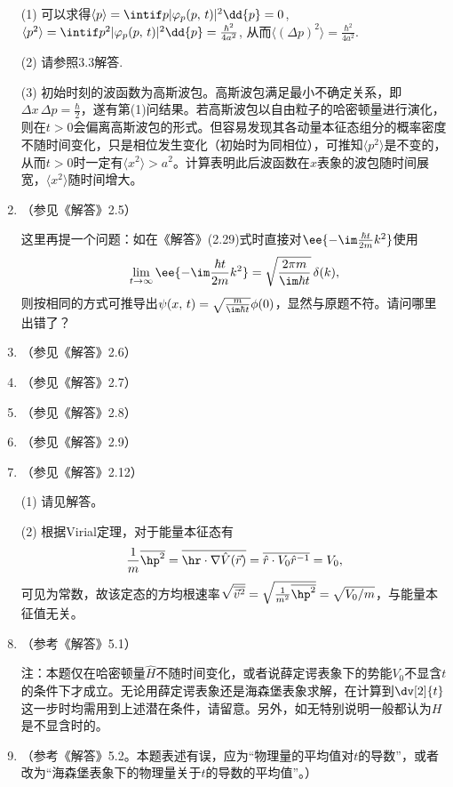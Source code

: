 \begin{enumerate}[label=\textbf{3.\arabic*}]
(1) 可以求得$\langle p\rangle = \intif p|\varphi_p(p,\,t)|^2\dd{p} = 0$, $\langle p^2\rangle = \intif p^2|\varphi_p(p,\,t)|^2\dd{p} = \frac{\hbar^2}{4a^2}$, 从而$\langle(\Delta p)^2\rangle = \frac{\hbar^2}{4a^2}$.

(2) 请参照3.3解答.

(3) 初始时刻的波函数为高斯波包。高斯波包满足最小不确定关系，即$\Delta x \,\Delta p= \frac{\hbar}{2}$，遂有第(1)问结果。若高斯波包以自由粒子的哈密顿量进行演化，则在$t>0$会偏离高斯波包的形式。但容易发现其各动量本征态组分的概率密度不随时间变化，只是相位发生变化（初始时为同相位），可推知$\langle p^2\rangle$是不变的，从而$t>0$时一定有$\langle x^2\rangle>a^2$。计算表明此后波函数在$x$表象的波包随时间展宽，$\langle x^2\rangle$随时间增大。

\item（参见《解答》2.5）

这里再提一个问题：如在《解答》(2.29)式时直接对$\ee{-\im\frac{\hbar t}{2m}k^2}$使用
\[\lim_{t\rightarrow \infty} \ee{-\im\frac{\hbar t}{2m}k^2} = \sqrt{\frac{2\pi m}{\im \hbar t}} \,\delta(k),\]
则按相同的方式可推导出$\psi(x,\,t)=\sqrt{\frac{m}{\im\hbar t}}\phi(0)$，显然与原题不符。请问哪里出错了？

\item（参见《解答》2.6）

\item（参见《解答》2.7）

\item（参见《解答》2.8）

\item（参见《解答》2.9）

\item（参见《解答》2.12）

(1) 请见解答。

(2) 根据Virial定理，对于能量本征态有
\[\frac{1}{m}\overline{\hp^2}=\overline{\hr\cdot \nabla \hat{V}(\vec{r})}
=\overline{\hat{r}\cdot V_0\hat{r}^{-1}} = V_0,\]
可见为常数，故该定态的方均根速率$\sqrt{\overline{\vec{v}^2}}=\sqrt{\frac{1}{m^2}\overline{\hp^2}}=\sqrt{V_0/m}$，与能量本征值无关。

\item（参考《解答》5.1）

注：本题仅在哈密顿量$\hat{H}$不随时间变化，或者说薛定谔表象下的势能$V_0$不显含$t$的条件下才成立。无论用薛定谔表象还是海森堡表象求解，在计算到$\dv[2]{t}$这一步时均需用到上述潜在条件，请留意。另外，如无特别说明一般都认为$H$是不显含时的。

\item（参考《解答》5.2。本题表述有误，应为“物理量的平均值对$t$的导数”，或者改为“海森堡表象下的物理量关于$t$的导数的平均值”。）



\end{enumerate}
